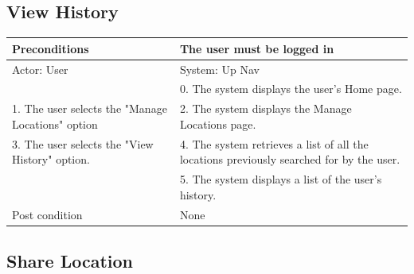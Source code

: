 \documentclass{article}
\begin{document}
\begin{enumerate}
	\subsection{View History}

	\centering

	\begin{tabular}{ | m{15em} | m{15em}| }
		\hline
		Preconditions                                   										& The user must be logged in \\ 
		\hline
		Actor: User                                    										& System: Up Nav \\ 
		\hline
                                               													& 0. The system displays the user's Home page. \\ 
		\hline
		1. The user selects the "Manage Locations" option								& 2. The system displays the Manage Locations page. \\
		\hline
		3. The user selects the "View History" option. 									& 4. The system retrieves a list of all the locations previously searched for by the user. \\ 
		\hline
                                               													& 5. The system displays a list of the user's history. \\
		 \hline
		Post condition                                 										& None \\ 
		\hline
	\end{tabular}
	

	\subsection{Share Location}

	\centering


\end{enumerate}
\end{document}
